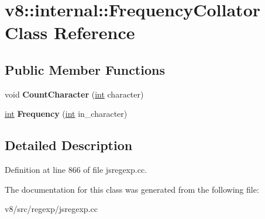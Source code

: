 \hypertarget{classv8_1_1internal_1_1FrequencyCollator}{}\section{v8\+:\+:internal\+:\+:Frequency\+Collator Class Reference}
\label{classv8_1_1internal_1_1FrequencyCollator}
\subsection*{Public Member Functions}
\begin{DoxyCompactItemize}
\item 
\mbox{\label{classv8_1_1internal_1_1FrequencyCollator_ade011457b027caad1d56d84de9c182ff}} 
void {\bfseries Count\+Character} (\mbox{\hyperlink{classint}{int}} character)
\item 
\mbox{\label{classv8_1_1internal_1_1FrequencyCollator_a30b9336ba6e9fc2a358408da97e5c107}} 
\mbox{\hyperlink{classint}{int}} {\bfseries Frequency} (\mbox{\hyperlink{classint}{int}} in\+\_\+character)
\end{DoxyCompactItemize}


\subsection{Detailed Description}


Definition at line 866 of file jsregexp.\+cc.



The documentation for this class was generated from the following file\+:\begin{DoxyCompactItemize}
\item 
v8/src/regexp/jsregexp.\+cc\end{DoxyCompactItemize}
